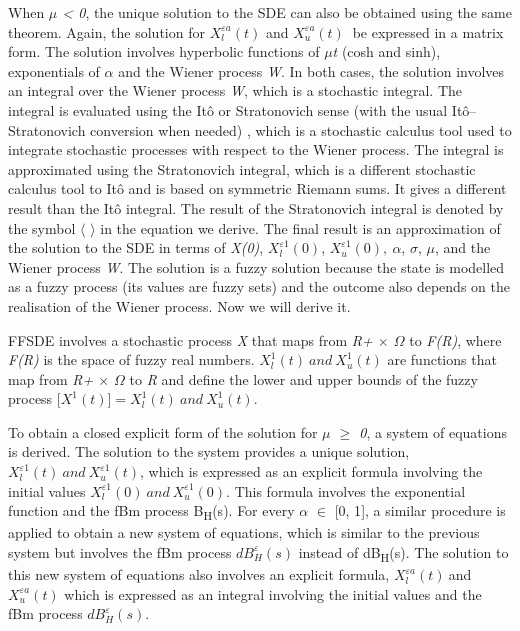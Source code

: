 \documentclass[12pt,a4paper]{report}
\numberwithin{equation}{section}
\begin{document}
When \emph{$\mu$ \textless{} 0}, the unique solution to the SDE can also be
obtained using the same theorem. Again, the solution for
\(X_{l}^{\varepsilon a}(t)\) and \(X_{u}^{\varepsilon a}(t)\ \) be
expressed in a matrix form. The solution involves hyperbolic functions
of \emph{$\mu$t} (cosh and sinh), exponentials of \emph{$\alpha$} and the Wiener
process \emph{W}. In both cases, the solution involves an integral over
the Wiener process \emph{W}, which is a stochastic integral. The
integral is evaluated using the Itô or Stratonovich sense (with the
usual Itô--Stratonovich conversion when needed) , which is a stochastic
calculus tool used to integrate stochastic processes with respect to the
Wiener process. The integral is approximated using the Stratonovich
integral, which is a different stochastic calculus tool to Itô and is
based on symmetric Riemann sums. It gives a different result than the
Itô integral. The result of the Stratonovich integral is denoted by the
symbol $\langle$ $\rangle$ in the equation we derive. The final result is an
approximation of the solution to the SDE in terms of \emph{X(0)},
\(X_{l}^{\varepsilon 1}(0)\), \(X_{u}^{\varepsilon 1}(0),\ \)\emph{$\alpha$},
\emph{$\sigma$}, \emph{$\mu$}, and the Wiener process \emph{W}. The solution is a
fuzzy solution because the state is modelled as a fuzzy process (its
values are fuzzy sets) and the outcome also depends on the realisation
of the Wiener process. Now we will derive it.

FFSDE involves a stochastic process \emph{X} that maps from \emph{R+ $\times$
$\Omega$} to \emph{F(R)}, where \emph{F(R)} is the space of fuzzy real numbers.
\(X_{l}^{1}(t)\ and\ X_{u}^{1}(t)\) are functions that map from \emph{R+
$\times$ $\Omega$} to \emph{R} and define the lower and upper bounds of the fuzzy
process \(\lbrack X^{1}(t)\rbrack = X_{l}^{1}(t)\ and\ X_{u}^{1}(t)\).

To obtain a closed explicit form of the solution for \emph{$\mu$ $\geq$ 0}, a
system of equations is derived. The solution to the system provides a
unique solution,
\(X_{l}^{\varepsilon 1}(t)\ and\ X_{u}^{\varepsilon 1}(t)\), which is
expressed as an explicit formula involving the initial values
\(X_{l}^{\varepsilon 1}(0)\ and\ X_{u}^{\varepsilon 1}(0)\). This
formula involves the exponential function and the fBm process
B\textsubscript{H}(s). For every $\alpha$ $\in$ {[}0, 1{]}, a similar procedure is
applied to obtain a new system of equations, which is similar to the
previous system but involves the fBm process \(dB_{H}^{\varepsilon}(s)\)
instead of dB\textsubscript{H}(s). The solution to this new system of
equations also involves an explicit formula,
\(X_{l}^{\varepsilon a}(t)\ \)and \(X_{u}^{\varepsilon a}(t)\) which is
expressed as an integral involving the initial values and the fBm
process \(dB_{H}^{\varepsilon}(s)\).
\end{document}
